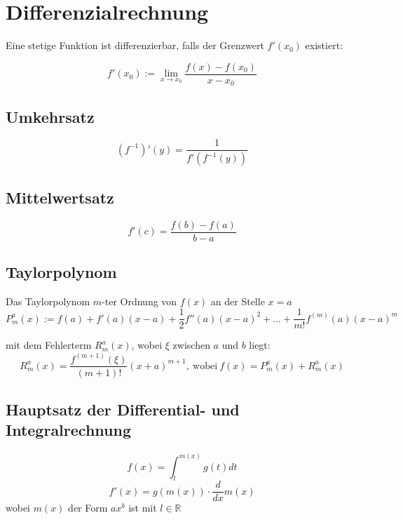 \documentclass[11pt]{article}
\begin{document}
\section{Differenzialrechnung}

Eine stetige Funktion ist differenzierbar, falls der Grenzwert $f'(x_0)$ existiert:

\begin{equation*}
	f'(x_0) := \lim_{x\to x_0}\frac{f(x) - f(x_0)}{x-x_0}
\end{equation*}

\subsection{Umkehrsatz}

\begin{equation*}
	(f^{-1})'(y) = \frac{1}{f'(f^{-1}(y))}
\end{equation*}

\subsection{Mittelwertsatz}

\begin{equation*}
	f'(c) = \frac{f(b) - f(a)}{b - a}
\end{equation*}

\subsection{Taylorpolynom}

Das Taylorpolynom $m$-ter Ordnung von $f(x)$ an der Stelle $x=a$
\begin{equation*}
	P^a_m(x) := f(a) + f'(a)(x-a) + \frac{1}{2}f''(a)(x-a)^2 + ... + \frac{1}{m!} f^{(m)}(a)(x-a)^m
\end{equation*}

mit dem Fehlerterm $R^a_m(x)$, wobei $\xi$ zwischen $a$ und $b$ liegt:
\begin{equation*}
	R^a_m(x) = \frac{f^{(m+1)}(\xi)}{(m+1)!}(x+a)^{m+1},\ \text{wobei}\ f(x) = P^a_m(x) + R^a_m(x)
\end{equation*}

\subsection{Hauptsatz der Differential- und Integralrechnung}

\begin{equation*}
	f(x)=\int^{m(x)}_lg(t)dt
\end{equation*}
\begin{equation*}
	f'(x)=g(m(x))\cdot\frac{d}{dx}m(x)
\end{equation*}
wobei $m(x)$ der Form $ax^b$ ist mit $l\in \mathbb{R}$
\end{document}

